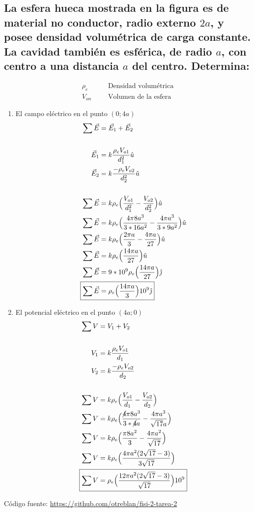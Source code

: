 \documentclass[10pt, twoside]{article}
\begin{document}
\subsection*{La esfera hueca mostrada en la figura es de material no conductor,
radio externo $2a$, y posee densidad volumétrica de carga constante.
La cavidad también es esférica, de radio $a$, con centro a una distancia
$a$ del centro. Determina:}%
\begin{align*}
	\rho_e & && \text{Densidad volumétrica}\\
	V_{on} & && \text{Volumen de la esfera}
\end{align*}
\begin{enumerate}[label=\textbf{\alph*)}]
	\item El campo eléctrico en el punto $(0;4a)$
		\begin{align*}
			\sum\vec{E} &= \vec{E}_1 + \vec{E}_2\\
			\\
			\vec{E}_1 &= k \frac{\rho_eV_{o1}}{d_1^2}\hat{u}\\
			\vec{E}_2 &= k \frac{-\rho_eV_{o2}}{d_2^2}\hat{u}\\
			\\
			\sum\vec{E} &= k\rho_e\Big{(}\frac{V_{o1}}{d_1^2}-\frac{V_{o2}}{d_2^2}\Big{)}\hat{u}\\
			\sum\vec{E} &= k\rho_e\Big{(}\frac{4\pi 8a^3}{3*16a^2}-\frac{4\pi a^3}{3*9a^2}\Big{)}\hat{u}\\
			\sum\vec{E} &= k\rho_e\Big{(}\frac{2\pi a}{3}-\frac{4\pi a}{27}\Big{)}\hat{u}\\
			\sum\vec{E} &= k\rho_e\Big{(}\frac{14\pi a}{27}\Big{)}\hat{u}\\
			\sum\vec{E} &= 9*10^9\rho_e\Big{(}\frac{14\pi a}{27}\Big{)}\hat{\jmath}\\
			\Aboxed
			{
				\sum\vec{E} &= \rho_e\Big{(}\frac{14\pi a}{3}\Big{)}10^9\hat{\jmath}
			}
		\end{align*}
	\item El potencial eléctrico en el punto $(4a;0)$
		\begin{align*}
			\sum V &= V_1+V_2\\
			\\
			V_1 &= k \frac{\rho_eV_{o1}}{d_1}\\
			V_2 &= k \frac{-\rho_eV_{o2}}{d_2}\\
			\\
			\sum V &= k\rho_e \Big{(} \frac{V_{o1}}{d_1}- \frac{V_{o2}}{d_2} \Big{)}\\
			\sum V &= k\rho_e \Big{(} \frac{\cancel{4}\pi 8a^3}{3*\cancel{4}a}- \frac{4\pi a^3}{ \sqrt{17}a} \Big{)}\\
			\sum V &= k\rho_e \Big{(} \frac{\pi 8a^2}{3}- \frac{4\pi a^2}{ \sqrt{17}} \Big{)}\\
			\sum V &= k\rho_e \Big{(} \frac{4\pi a^2(2\sqrt{17}-3)}{3\sqrt{17}} \Big{)}\\
			\Aboxed
			{
				\sum V &= \rho_e \Big{(} \frac{12\pi a^2(2\sqrt{17}-3)}{\sqrt{17}} \Big{)}10^9
			}
		\end{align*}
\end{enumerate}
\vfill
Código fuente: \url{https://github.com/otreblan/fisi-2-tarea-2}
\end{document}
